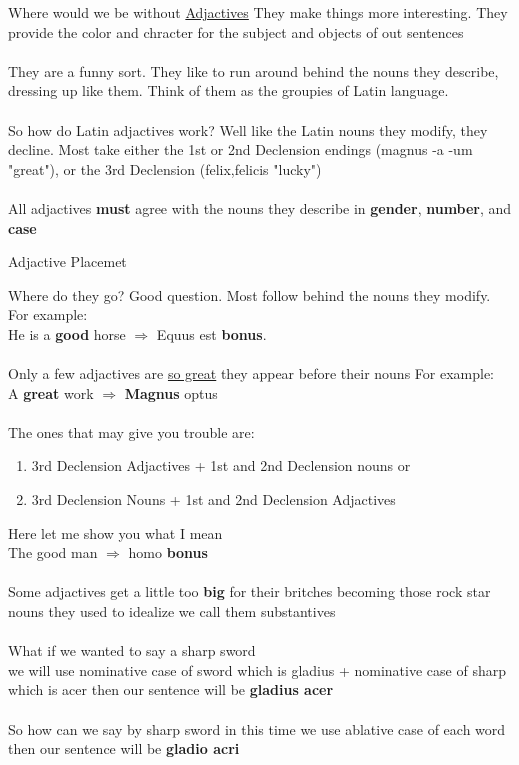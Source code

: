 Where would we be without \underline{Adjactives} They make
things more interesting. They provide the color and chracter
for the subject and objects of out sentences \\ \\ 
They are a funny sort. They like to run around behind the 
nouns they describe, dressing up like them. Think of them 
as the groupies of Latin language. \\ \\ 
So how do Latin adjactives work? Well like the Latin nouns they
modify, they decline. Most take either the 1st or 2nd Declension
endings (magnus -a -um "great"), or the 3rd Declension 
(felix,felicis "lucky") \\ \\ 
All adjactives \textbf{must} agree with the nouns they describe 
in \textbf{gender}, \textbf{number}, and \textbf{case}
\begin{center}
  \Large Adjactive Placemet
\end{center}
Where do they go? Good question. Most follow behind the nouns
they modify. For example: \\ 
He is a \textbf{good} horse $\Longrightarrow$ Equus est \textbf{bonus}. \\ \\ 
Only a few adjactives are \underline{so great} they appear before
their nouns For example: \\ 
A \textbf{great} work $\Longrightarrow$ \textbf{Magnus} optus \\ \\ 
The ones that may give you trouble are:
\begin{enumerate}[I]
  \item 3rd Declension Adjactives + 1st and 2nd Declension nouns or
  \item 3rd Declension Nouns + 1st and 2nd Declension Adjactives 
\end{enumerate}
Here let me show you what I mean \\
The good man $\Longrightarrow$ homo \textbf{bonus} \\ \\ 
Some adjactives get a little too \textbf{big} for their britches
becoming those rock star nouns they used to idealize we call 
them substantives \\ \\ 
What if we wanted to say a sharp sword \\ 
we will use nominative case of sword which is gladius + nominative 
case of sharp which is acer then our sentence will be \textbf{gladius acer} \\ \\ 
So how can we say by sharp sword in this time we use ablative case of each word \\ 
then our sentence will be \textbf{gladio acri}

